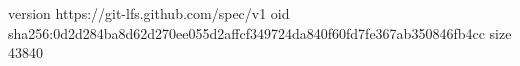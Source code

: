 version https://git-lfs.github.com/spec/v1
oid sha256:0d2d284ba8d62d270ee055d2affcf349724da840f60fd7fe367ab350846fb4cc
size 43840
